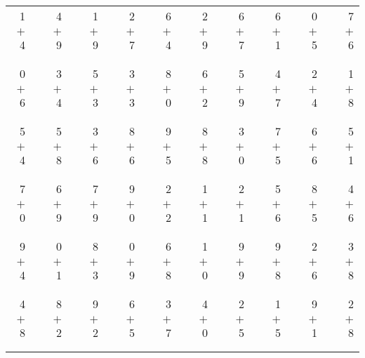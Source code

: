\documentclass[12pt, letterpaper]{article}
\begin{document}
\begin{tabular}{rrrrrrrrrrrrrrrrrrr}
1 & & 4 & & 1 & & 2 & & 6 & & 2 & & 6 & & 6 & & 0 & & 7\\
$+$ 4 & & $+$ 9 & & $+$ 9 & & $+$ 7 & & $+$ 4 & & $+$ 9 & & $+$ 7 & & $+$ 1 & & $+$ 5 & & $+$ 6\\
\cline{1-1} \cline{3-3} \cline{5-5} \cline{7-7} \cline{9-9} \cline{11-11} \cline{13-13} \cline{15-15} \cline{17-17} \cline{19-19} \\ \\
0 & & 3 & & 5 & & 3 & & 8 & & 6 & & 5 & & 4 & & 2 & & 1\\
$+$ 6 & & $+$ 4 & & $+$ 3 & & $+$ 3 & & $+$ 0 & & $+$ 2 & & $+$ 9 & & $+$ 7 & & $+$ 4 & & $+$ 8\\
\cline{1-1} \cline{3-3} \cline{5-5} \cline{7-7} \cline{9-9} \cline{11-11} \cline{13-13} \cline{15-15} \cline{17-17} \cline{19-19} \\ \\
5 & & 5 & & 3 & & 8 & & 9 & & 8 & & 3 & & 7 & & 6 & & 5\\
$+$ 4 & & $+$ 8 & & $+$ 6 & & $+$ 6 & & $+$ 5 & & $+$ 8 & & $+$ 0 & & $+$ 5 & & $+$ 6 & & $+$ 1\\
\cline{1-1} \cline{3-3} \cline{5-5} \cline{7-7} \cline{9-9} \cline{11-11} \cline{13-13} \cline{15-15} \cline{17-17} \cline{19-19} \\ \\
7 & & 6 & & 7 & & 9 & & 2 & & 1 & & 2 & & 5 & & 8 & & 4\\
$+$ 0 & & $+$ 9 & & $+$ 9 & & $+$ 0 & & $+$ 2 & & $+$ 1 & & $+$ 1 & & $+$ 6 & & $+$ 5 & & $+$ 6\\
\cline{1-1} \cline{3-3} \cline{5-5} \cline{7-7} \cline{9-9} \cline{11-11} \cline{13-13} \cline{15-15} \cline{17-17} \cline{19-19} \\ \\
9 & & 0 & & 8 & & 0 & & 6 & & 1 & & 9 & & 9 & & 2 & & 3\\
$+$ 4 & & $+$ 1 & & $+$ 3 & & $+$ 9 & & $+$ 8 & & $+$ 0 & & $+$ 9 & & $+$ 8 & & $+$ 6 & & $+$ 8\\
\cline{1-1} \cline{3-3} \cline{5-5} \cline{7-7} \cline{9-9} \cline{11-11} \cline{13-13} \cline{15-15} \cline{17-17} \cline{19-19} \\ \\
4 & & 8 & & 9 & & 6 & & 3 & & 4 & & 2 & & 1 & & 9 & & 2\\
$+$ 8 & & $+$ 2 & & $+$ 2 & & $+$ 5 & & $+$ 7 & & $+$ 0 & & $+$ 5 & & $+$ 5 & & $+$ 1 & & $+$ 8\\
\cline{1-1} \cline{3-3} \cline{5-5} \cline{7-7} \cline{9-9} \cline{11-11} \cline{13-13} \cline{15-15} \cline{17-17} \cline{19-19} \\ \\

\end{tabular}
\end{document}
